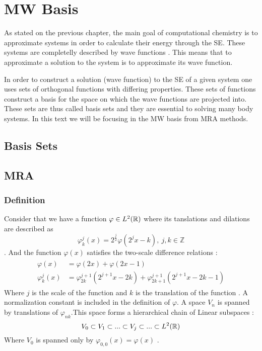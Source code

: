 \documentclass[../master_thesis.tex]{subfiles}
\begin{document}
\chapter{\ac{MW} Basis}
As stated on the previous chapter, the main goal of computational chemistry is
to approximate systems in order to calculate their energy through the \newline \ac{SE}. %
These systems are completelly described by wave functions \cite{Cohen:1973}.
This means that to approximate a solution to the system is to approximate its
wave function.

In order to construct a solution (wave function) to the \ac{SE} of a given
system one uses sets of orthogonal functions with differing properties. These
sets of functions construct a basis for the space on which the wave functions
are projected into. These sets are thus called basis sets \cite{Cramer:2004}
and they are essential to solving many body systems. In this text we will be
focusing in the \ac{MW} basis from \ac{MRA} methods.
\section{Basis Sets}

\section{\ac{MRA}}
\subsection{Definition}
Consider that we have a function $\varphi \in L^2(\mathbb{R})$ where its tanslations
and dilations are described as \cite{Schneider:2007}
\begin{equation}
  \varphi^j_k(x) = 2^{\frac{j}{2}}\varphi(2^jx - k),\  j,k \in \mathbb{Z}
\end{equation}.
And the function $\varphi(x)$ satisfies the two-scale difference relations \cite{Beylkin:MRA, Schneider:2007, Sorland}:
\begin{align}
  \begin{split}
    \varphi(x) &= \varphi(2x) + \varphi(2x - 1)\\
    \varphi^j_k(x) &= \varphi^{j+1}_{2k}(2^{j+1}x - 2k) + \varphi^{j+1}_{2k+1}(2^{j+1}x - 2k - 1)
  \end{split}
\end{align}
Where $j$ is the scale of the function and $k$ is the translation of the function
\cite{Sorland}. A normalization constant is included in the definition of $\varphi$.
A space $V_n$ is spanned by translations of $\varphi_{nk}$.This space forms a
hierarchical chain of Linear
subspaces \cite{Beylkin:MRA}:
\begin{equation}
  V_0 \subset V_1 \subset ... \subset V_j \subset ... \subset L^2(\mathbb{R})\label{eq:seqsubspace}
\end{equation}
Where $V_0$ is spanned only by $\varphi_{0,0}(x)=\varphi(x)$ \cite{Sorland}.
\end{document}
